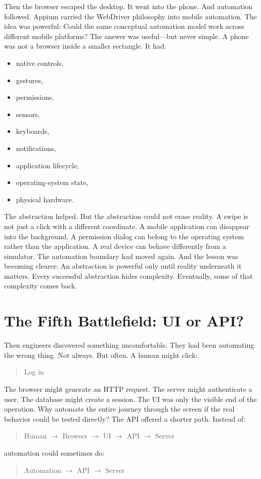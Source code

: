 \documentclass[11pt,twoside]{book}
\begin{document}
Then the browser escaped the desktop.
It went into the phone.
And automation followed.
Appium carried the WebDriver philosophy into mobile automation.
The idea was powerful:
Could the same conceptual automation model work across different mobile platforms?
The answer was useful---but never simple.
A phone was not a browser inside a smaller rectangle.
It had:
\begin{itemize}[nosep]
    \item native controls,
    \item gestures,
    \item permissions,
    \item sensors,
    \item keyboards,
    \item notifications,
    \item application lifecycle,
    \item operating-system state,
    \item physical hardware.
\end{itemize}

The abstraction helped.
But the abstraction could not erase reality.
A swipe is not just a click with a different coordinate.
A mobile application can disappear into the background.
A permission dialog can belong to the operating system rather than the application.
A real device can behave differently from a simulator.
The automation boundary had moved again.
And the lesson was becoming clearer:
An abstraction is powerful only until reality underneath it matters.
Every successful abstraction hides complexity.
Eventually, some of that complexity comes back.

\section*{The Fifth Battlefield: UI or API?}

Then engineers discovered something uncomfortable.
They had been automating the wrong thing.
Not always.
But often.
A human might click:
\begin{quote}
Log in
\end{quote}
The browser might generate an HTTP request.
The server might authenticate a user.
The database might create a session.
The UI was only the visible end of the operation.
Why automate the entire journey through the screen if the real behavior could be tested directly?
The API offered a shorter path.
Instead of:
\begin{quote}
Human $\rightarrow$ Browser $\rightarrow$ UI $\rightarrow$ API $\rightarrow$ Server
\end{quote}
automation could sometimes do:
\begin{quote}
Automation $\rightarrow$ API $\rightarrow$ Server
\end{quote}
\end{document}
